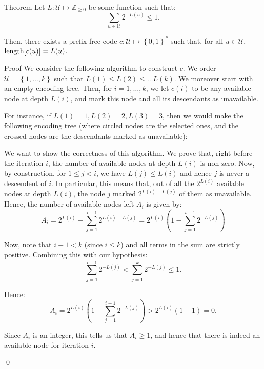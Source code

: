 \documentclass[a4paper]{article}
\begin{document}
\begin{parag}{Theorem}
    Let $L: \mathcal{U} \mapsto \mathbb{Z}_{\geq 0}$ be some function such that: 
    \[\sum_{u \in \mathcal{U}} 2^{-L\left(u\right)} \leq 1.\]
    
    Then, there exists a prefix-free code $c: \mathcal{U} \mapsto \left\{0, 1\right\}^*$ such that, for all $u \in \mathcal{U}$, $\length\left[c\left(u\right)\right] = L\left(u\right)$.

    \begin{subparag}{Proof}
        We consider the following algorithm to construct $c$. We order $\mathcal{U} = \left\{1, \ldots, k\right\}$ such that $L\left(1\right) \leq L\left(2\right) \leq \ldots  L\left(k\right)$. We moreover start with an empty encoding tree. Then, for $i = 1, \ldots, k$, we let $c\left(i\right)$ to be any available node at depth $L\left(i\right)$, and mark this node and all its descendants as unavailable.

        For instance, if $L\left(1\right) = 1, L\left(2\right) = 2, L\left(3\right) = 3$, then we would make the following encoding tree (where circled nodes are the selected ones, and the crossed nodes are the descendants marked as unavailable):

        We want to show the correctness of this algorithm. We prove that, right before the iteration $i$, the number of available nodes at depth $L\left(i\right)$ is non-zero. Now, by construction, for $1 \leq j < i$, we have $L\left(j\right) \leq L\left(i\right)$ and hence $j$ is never a descendent of $i$. In particular, this means that, out of all the $2^{L\left(i\right)}$ available nodes at depth $L\left(i\right)$, the node $j$ marked $2^{L\left(i\right) - L\left(j\right)}$ of them as unavailable. Hence, the number of available nodes left $A_i$ is given by: 
        \[A_i = 2^{L\left(i\right)} - \sum_{j=1}^{i-1} 2^{L\left(i\right) - L\left(j\right)} = 2^{L\left(i\right)} \left(1 - \sum_{j=1}^{i-1} 2^{-L\left(j\right)}\right)\]

        Now, note that $i - 1 < k$ (since $i \leq k$) and all terms in the sum are strictly positive. Combining this with our hypothesis: 
        \[\sum_{j=1}^{i-1} 2^{-L\left(j\right)} < \sum_{j=1}^{k} 2^{-L\left(j\right)} \leq 1.\]
        
        Hence:
        \[A_i = 2^{L\left(i\right)} \left(1 - \sum_{j=1}^{i-1} 2^{-L\left(j\right)}\right) > 2^{L\left(i\right)}\left(1 - 1\right) = 0.\]

        Since $A_i$ is an integer, this tells us that $A_i \geq 1$, and hence that there is indeed an available node for iteration $i$.

        \qed
    \end{subparag}
\end{parag}
\end{document}
